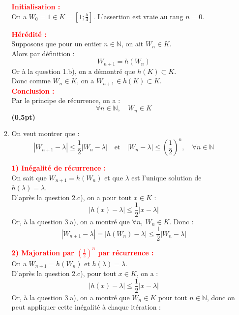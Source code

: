 \documentclass[12pt,a4paper]{article}
\begin{document}
\begin{enumerate}
\begin{enumerate}
        \textcolor{red}{\textbf{Initialisation :}}\\
        On a \( W_0 = 1 \in K = \left[1 ; \frac{5}{4} \right] \). L’assertion est vraie au rang \( n = 0 \).

        \textcolor{red}{\textbf{Hérédité :}}\\
        Supposons que pour un entier \( n \in \mathbb{N} \), on ait \( W_n \in K \).\\
        Alors par définition :
        \[
            W_{n+1} = h(W_n)
        \]
        Or à la question 1.b), on a démontré que \( h(K) \subset K \).\\
        Donc comme \( W_n \in K \), on a \( W_{n+1} \in h(K) \subset K \).\\

        \textcolor{red}{\textbf{Conclusion :}}\\
        Par le principe de récurrence, on a :
        \[
            \forall n \in \mathbb{N},\quad W_n \in K
        \]
        \hfill \textbf{(0,5pt)}
        
        \item  On veut montrer que :
        \[
            |W_{n+1} - \lambda| \leq \frac{1}{2}|W_n - \lambda| \quad \text{et} \quad |W_n - \lambda| \leq \left( \frac{1}{2} \right)^n, \quad \forall n \in \mathbb{N}
        \]

        \textcolor{red}{\textbf{1) Inégalité de récurrence :}}\\
        On sait que \( W_{n+1} = h(W_n) \) et que \( \lambda \) est l’unique solution de \( h(\lambda) = \lambda \).\\
        D’après la question 2.c), on a pour tout \( x \in K \) :
        \[
            |h(x) - \lambda| \leq \frac{1}{2} |x - \lambda|
        \]
        Or, à la question 3.a), on a montré que \( \forall n, \ W_n \in K \). Donc :
        \[
            |W_{n+1} - \lambda| = |h(W_n) - \lambda| \leq \frac{1}{2} |W_n - \lambda|
        \]

        \textcolor{red}{\textbf{2) Majoration par \( \left( \frac{1}{2} \right)^n \) par récurrence :}}\\

        On a \( W_{n+1} = h(W_n) \) et \( h(\lambda) = \lambda \).\\
        D’après la question 2.c), pour tout \( x \in K \), on a :
        \[
            |h(x) - \lambda| \leq \frac{1}{2} |x - \lambda|
        \]
        Or, à la question 3.a), on a montré que \( W_n \in K \) pour tout \( n \in \mathbb{N} \), donc on peut appliquer cette inégalité à chaque itération :


\end{enumerate}
\end{enumerate}
\end{document}
